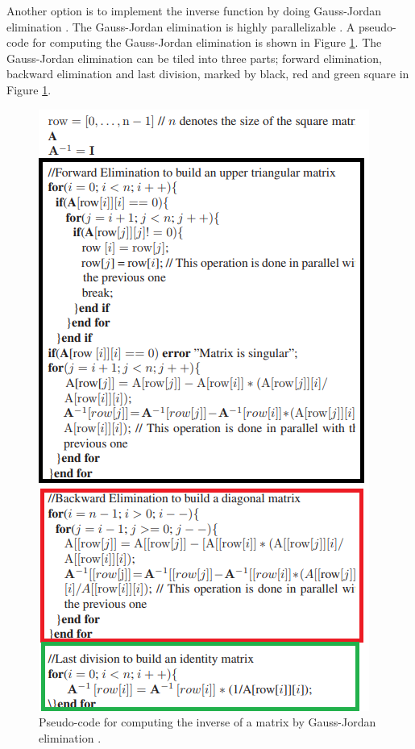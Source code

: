 Another option is to implement the inverse function by doing Gauss-Jordan elimination \cite{gauss_jordan_fpga}. The Gauss-Jordan elimination is highly parallelizable \cite{gauss_jordan_fpga}. A pseudo-code for computing the Gauss-Jordan elimination is shown in Figure \ref{fig:gauss_jordan_pseudocode}. The Gauss-Jordan elimination can be tiled into three parts; forward elimination, backward elimination and last division, marked by black, red and green square in Figure \ref{fig:gauss_jordan_pseudocode}. 
\begin{figure}[H]
\centering
   \includegraphics[scale=0.7]{images/gauss_jordan_pseudocode.png}
  \caption{ Pseudo-code for computing the inverse of a matrix by Gauss-Jordan elimination \cite{gauss_jordan_fpga}. } 
  \label{fig:gauss_jordan_pseudocode}
\end{figure}



